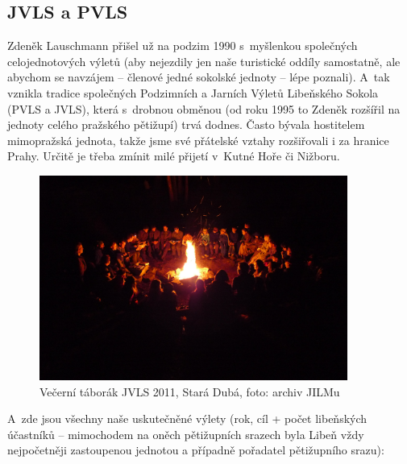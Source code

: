 \documentclass[a5paper, 11pt, twoside]{article}
\begin{document}
\subsection{JVLS a PVLS}

Zdeněk Lauschmann přišel už na podzim 1990 s~myšlenkou společných
celojednotových výletů (aby nejezdily jen naše turistické oddíly
samostatně, ale abychom se navzájem -- členové jedné sokolské jednoty --
lépe poznali). A~tak vznikla tradice společných Podzimních a Jarních
Výletů Libeňského Sokola (PVLS a JVLS), která s~drobnou obměnou (od roku
1995 to Zdeněk rozšířil na jednoty celého pražského pětižupí) trvá
dodnes. Často bývala hostitelem mimopražská jednota, takže jsme své
přátelské vztahy rozšiřovali i za hranice Prahy. Určitě je třeba zmínit
milé přijetí v~Kutné Hoře či Nižboru.

\begin{figure}[h!]
  \centering 
  \includegraphics[width=0.9\textwidth]{img/38_jvls_taborak.JPG}
  \caption*{Večerní táborák JVLS 2011, Stará Dubá, foto: archiv JILMu}
\end{figure}

A~zde jsou všechny naše uskutečněné výlety (rok, cíl + počet libeňských
účastníků -- mimochodem na oněch pětižupních srazech byla Libeň vždy
nejpočetněji zastoupenou jednotou a případně pořadatel pětižupního
srazu):
\end{document}
